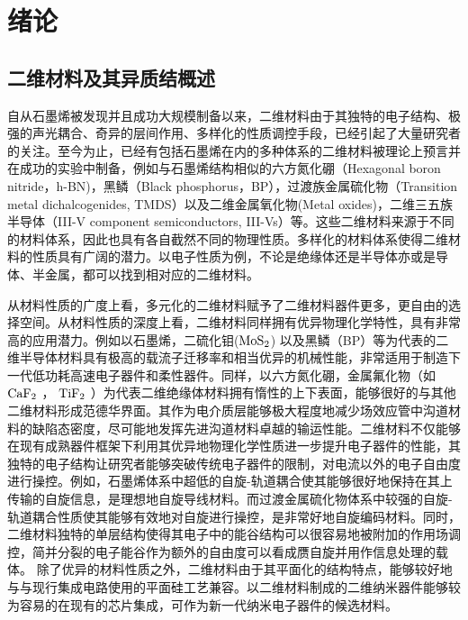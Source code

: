 \chapter{绪\hspace{6pt}论}

\section{二维材料及其异质结概述}
自从石墨烯被发现并且成功大规模制备以来，二维材料由于其独特的电子结构、极强的声光耦合、奇异的层间作用、多样化的性质调控手段，已经引起了大量研究者的关注。至今为止，已经有包括石墨烯在内的多种体系的二维材料被理论上预言并在成功的实验中制备，例如与石墨烯结构相似的六方氮化硼（Hexagonal boron nitride，h-BN)，黑鳞（Black phosphorus，BP），过渡族金属硫化物（Transition metal dichalcogenides, TMDS）以及二维金属氧化物(Metal oxides)，二维三五族半导体（III-V component semiconductors, III-Vs）等。这些二维材料来源于不同的材料体系，因此也具有各自截然不同的物理性质。多样化的材料体系使得二维材料的性质具有广阔的潜力。以电子性质为例，不论是绝缘体还是半导体亦或是导体、半金属，都可以找到相对应的二维材料。

从材料性质的广度上看，多元化的二维材料赋予了二维材料器件更多，更自由的选择空间。从材料性质的深度上看，二维材料同样拥有优异物理化学特性，具有非常高的应用潜力。例如以石墨烯，二硫化钼($ \rm{MoS_{2}} $) 以及黑鳞（BP）等为代表的二维半导体材料具有极高的载流子迁移率和相当优异的机械性能，非常适用于制造下一代低功耗高速电子器件和柔性器件。同样，以六方氮化硼，金属氟化物（如 $ \rm{CaF_{2}} $ ， $\rm{TiF_{2}}$ ）为代表二维绝缘体材料拥有惰性的上下表面，能够很好的与其他二维材料形成范德华界面。其作为电介质层能够极大程度地减少场效应管中沟道材料的缺陷态密度，尽可能地发挥先进沟道材料卓越的输运性能。二维材料不仅能够在现有成熟器件框架下利用其优异地物理化学性质进一步提升电子器件的性能，其独特的电子结构让研究者能够突破传统电子器件的限制，对电流以外的电子自由度进行操控。例如，石墨烯体系中超低的自旋-轨道耦合使其能够很好地保持在其上传输的自旋信息，是理想地自旋导线材料。而过渡金属硫化物体系中较强的自旋-轨道耦合性质使其能够有效地对自旋进行操控，是非常好地自旋编码材料。同时，二维材料独特的单层结构使得其电子中的能谷结构可以很容易地被附加的作用场调控，简并分裂的电子能谷作为额外的自由度可以看成赝自旋并用作信息处理的载体。
除了优异的材料性质之外，二维材料由于其平面化的结构特点，能够较好地与与现行集成电路使用的平面硅工艺兼容。以二维材料制成的二维纳米器件能够较为容易的在现有的芯片集成，可作为新一代纳米电子器件的候选材料。

